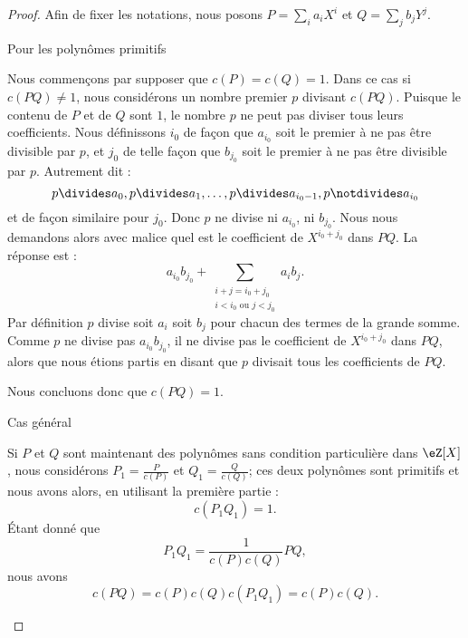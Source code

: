 \begin{proof}
	Afin de fixer les notations, nous posons \( P=\sum_ia_iX^i\) et \( Q=\sum_jb_jY^j\).

	\begin{subproof}
		\item[Pour les polynômes primitifs]

		Nous commençons par supposer que \( c(P)=c(Q)=1\). Dans ce cas si \( c(PQ)\neq 1\), nous considérons un nombre premier \( p\) divisant \( c(PQ)\). Puisque le contenu de \( P\) et de \( Q\) sont \( 1\), le nombre \( p\) ne peut pas diviser tous leurs coefficients. Nous définissons \( i_0\) de façon que \( a_{i_0}\) soit le premier à ne pas être divisible par \( p\), et \( j_0\) de telle façon que \( b_{j_0}\) soit le premier à ne pas être divisible par \( p\). Autrement dit :
		\begin{equation}
			p\divides a_0, p\divides a_1, \ldots, p\divides a_{i_0-1}, p\notdivides a_{i_0}
		\end{equation}
		et de façon similaire pour \( j_0\). Donc \( p\) ne divise ni \( a_{i_0}\), ni \( b_{j_0}\). Nous nous demandons alors avec malice quel est le coefficient de \( X^{i_0+j_0}\) dans \( PQ\). La réponse est :
		\begin{equation}
			a_{i_0}b_{j_0}+\sum_{\substack{i+j=i_0+j_0\\i<i_0\text{ ou }j<j_0}}a_ib_j.
		\end{equation}
		Par définition \( p\) divise soit \( a_i\) soit \( b_j\) pour chacun des termes de la grande somme. Comme \( p\) ne divise pas \( a_{i_0}b_{j_0}\), il ne divise pas le coefficient de \( X^{i_0+j_0}\) dans \( PQ\), alors que nous étions partis en disant que \( p\) divisait tous les coefficients de \( PQ\).

		Nous concluons donc que \( c(PQ)=1\).

		\item[Cas général]

		Si \( P\) et \( Q\) sont maintenant des polynômes sans condition particulière dans \( \eZ[X]\), nous considérons \( P_1=\frac{ P }{ c(P) }\) et \( Q_1=\frac{ Q }{ c(Q) }\); ces deux polynômes sont primitifs et nous avons alors, en utilisant la première partie :
		\begin{equation}
			c(P_1Q_1)=1.
		\end{equation}
		Étant donné que
		\begin{equation}
			P_1Q_1=\frac{1}{ c(P)c(Q) }PQ,
		\end{equation}
		nous avons
		\begin{equation}
			c(PQ)=c(P)c(Q)c(P_1Q_1)=c(P)c(Q).
		\end{equation}
	\end{subproof}
\end{proof}

